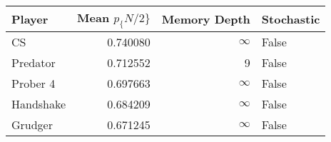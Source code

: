 \begin{tabular}{lrrl}
\toprule
    Player &  Mean $p_\{N/2\}$ &  Memory Depth & Stochastic \\
\midrule
        CS &        0.740080 &            \(\infty\) &      False \\
  Predator &        0.712552 &             9 &      False \\
  Prober 4 &        0.697663 &            \(\infty\) &      False \\
 Handshake &        0.684209 &            \(\infty\) &      False \\
   Grudger &        0.671245 &            \(\infty\) &      False \\
\bottomrule
\end{tabular}

